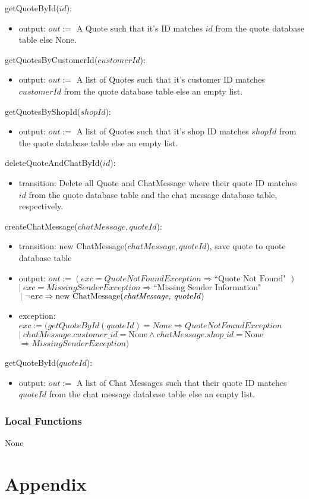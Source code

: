 \documentclass[12pt, titlepage]{article}
\begin{document}
\noindent getQuoteById($id$):
\begin{itemize}
	\item output: $out :=$ A Quote such that it's ID matches $id$ from the quote database table else None.
\end{itemize}

\noindent getQuotesByCustomerId($customerId$):
\begin{itemize}
	\item output: $out :=$ A list of Quotes such that it's customer ID matches $customerId$ from the quote
	      database table else an empty list.
\end{itemize}

\noindent getQuotesByShopId($shopId$):
\begin{itemize}
	\item output: $out :=$ A list of Quotes such that it's shop ID matches $shopId$ from the quote database
	      table else an empty list.
\end{itemize}

\noindent deleteQuoteAndChatById($id$):
\begin{itemize}
	\item transition: Delete all Quote and ChatMessage where their quote ID matches $id$ from the quote
	      database table and the chat message database table, respectively.
\end{itemize}

\noindent createChatMessage($chatMessage, quoteId$):
\begin{itemize}
	\item transition: new ChatMessage($chatMessage, quoteId$), save quote to quote database table
	\item output: $out := (exc = QuoteNotFoundException \Rightarrow \text{``Quote Not Found" })$ \\ $|\ exc =
		      MissingSenderException \Rightarrow \text{``Missing Sender Information" }$ \\ $|\ \neg exc
		      \Rightarrow \text{new ChatMessage(\emph{chatMessage, quoteId})}$
	\item exception: $exc := (getQuoteById(quoteId) = None \Rightarrow QuoteNotFoundException$ \\ $ |\
		      chatMessage.customer\_id = \text{None} \land chatMessage.shop\_id = \text{None}$ \\ $\Rightarrow
		      MissingSenderException)$
\end{itemize}

\noindent getQuoteById($quoteId$):
\begin{itemize}
	\item output: $out :=$ A list of Chat Messages such that their quote ID matches $quoteId$ from the chat
	      message database table else an empty list.
\end{itemize}

\subsubsection{Local Functions}

None

\newpage




\newpage

\section{Appendix}
\end{document}
